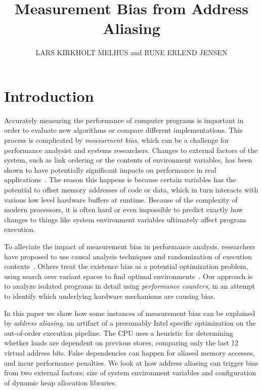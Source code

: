 \documentclass[prodmode,acmtaco]{acmsmall}
\title{Measurement Bias from Address Aliasing}
\author{
LARS KIRKHOLT MELHUS and RUNE ERLEND JENSEN
  \affil{Norwegian University of Science and Technology}}
\begin{document}
\begin{bottomstuff}
\end{bottomstuff}

\maketitle


\section{Introduction}
Accurately measuring the performance of computer programs is important in order to evaluate new algorithms or compare different implementations.
This process is complicated by \emph{measurment bias}, which can be a challenge for performance analysist and systems researchers.
Changes to external factors of the system, such as link ordering or the contents of environment variables, has been shown to have potentially significant impacts on performance in real applications~\cite{Mytkowicz:2009:WrongData}.
The reason this happens is because certain variables has the potential to offset memory addresses of code or data, which in turn interacts with various low level hardware buffers at runtime.
Because of the complexity of modern processors, it is often hard or even impossible to predict exactly how changes to things like system environment variables ultimately affect program execution.

To alleviate the impact of measurement bias in performance analysis, researchers have proposed to use causal analysis techniques and randomization of execution contexts~\cite{Mytkowicz:2008:OE&MB}.
Others treat the existence bias as a potential optimization problem, using search over variant spaces to find optimal environments~\cite{Knights:2009:BlindOpt}.
Our approach is to analyze isolated programs in detail using \emph{performance counters}, in an attempt to identify which underlying hardware mechanisms are causing bias.

In this paper we show how some instances of measurement bias can be explained by \emph{address aliasing}, an artifact of a presumably Intel specific optimization on the out-of-order execution pipeline.
The CPU uses a heuristic for determining whether loads are dependent on previous stores, comparing only the last 12 virtual address bits.
False dependencies can happen for aliased memory accesses, and incur performance penalties.
We look at how address aliasing can trigger bias from two external factors; size of system environment variables and configuration of dynamic heap allocation libraries.
\end{document}
